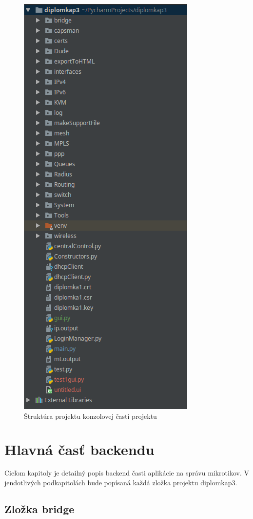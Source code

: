 \begin{figure}[H]
\centering
\includegraphics[scale=0.4]{../text/struktura.png}
\caption{Štruktúra projektu konzolovej časti projektu}
\label{fig:structure}
\end{figure} 
\chapter{Hlavná časť backendu}
Cieľom kapitoly je detailný popis backend časti aplikácie na správu mikrotikov. V jendotlivých podkapitolách bude popísaná každá zložka projektu diplomkap3.
\section{Zložka bridge}
